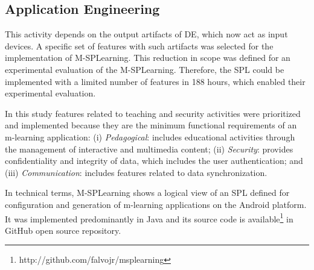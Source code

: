 \subsection{Application Engineering}\label{section32}

This activity depends on the output artifacts of DE, which now act as input devices. A specific set of features with such artifacts was selected for the implementation of M-SPLear\allowbreak ning. This reduction in scope was defined for an experimental evaluation of the M-SPLear\allowbreak ning. Therefore, the SPL could be implemented with a limited number of features in 188 hours, which enabled their experimental evaluation.

In this study features related to teaching and security activities were prioritized and implemented because they are the minimum functional requirements of an m-learning application: (i) \textit{Pedagogical}: includes educational activities through the management of interactive and multimedia content; (ii) \textit{Security}: provides confidentiality and integrity of data, which includes the user authentication; and (iii) \textit{Communication}: includes features related to data synchronization.

In technical terms,  M-SPLear\allowbreak ning shows a logical view of an SPL defined for configuration and generation of m-learning applications on the Android platform. It was implemented predominantly in Java and its source code is available\footnote{http://github.com/falvojr/msplearning} in GitHub open source repository.

